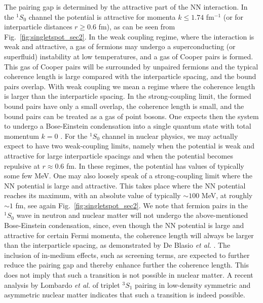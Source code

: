 \documentclass[rmp,aps,floatfix]{revtex4}
\begin{document}
The pairing gap is determined by the attractive part
of the NN interaction. In the $^1S_0$ channel 
the potential is attractive for momenta $k \leq 1.74$ fm$^{-1}$
(or for interparticle distances $r \geq 0.6$ fm), as can be
seen from Fig.~\ref{fig:singletspot_sec2}. 
In the weak coupling regime, where the 
interaction is weak and attractive,  a
gas of fermions may undergo a superconducting (or superfluid) 
instability at low temperatures, and a gas of Cooper pairs is formed.   
This gas of Cooper pairs will be surrounded by unpaired fermions and
the typical coherence length is large compared with the interparticle
spacing, and the bound pairs overlap. 
With weak coupling
we mean a regime where the coherence length is larger than the 
interparticle spacing.
In the strong-coupling limit, the formed bound pairs 
have only a small
overlap, the coherence length is small, and the bound pairs
can be treated as a gas of point bosons. One expects then the system
to undergo a Bose-Einstein condensation into a single quantum
state with total momentum $k=0$ \cite{nsr85}.  
For the $^1S_0$ channel in nuclear physics, we may actually expect to have 
two weak-coupling limits,
namely when the potential is weak and attractive for large interparticle
spacings and when the potential becomes repulsive at $r\approx 0.6$ fm.
In these regimes, the potential has values of typically some few
MeV. One may also loosely speak of a strong-coupling limit 
where the NN potential is large 
and attractive. This takes place where the NN potential
reaches its maximum, with an absolute value of typically $\sim 100$ MeV, 
at roughly $\sim 1$ fm, see again Fig.~\ref{fig:singletspot_sec2}.
We note that
fermion pairs in the $^1S_0$ wave in neutron and nuclear matter will not
undergo the above-mentioned Bose-Einstein condensation, since, even though
the NN potential is large and attractive for certain Fermi momenta, the 
coherence length will always be larger than the interparticle spacing, 
as demonstrated by De Blasio {\em et al.} \cite{deblasio97}.
The inclusion of in-medium effects, such as screening
terms, are expected to further reduce the pairing gap 
and thereby enhance further the coherence
length. This does not imply that such a transition
is not possible in nuclear matter. A recent analysis by Lombardo
{\em et al.} \cite{lombardo2001,schuck2001} of
triplet $^3S_1$ pairing in low-density symmetric and asymmetric nuclear
matter indicates that such a transition
is indeed possible. 
\end{document}
